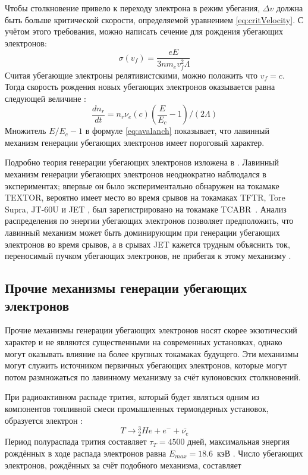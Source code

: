 Чтобы столкновение привело к переходу электрона в режим убегания, $\Delta v$ должна быть больше критической скорости, определяемой уравнением \ref{eq:critVelocity}. С учётом этого требования, можно написать сечение для рождения убегающих электронов:
\begin{equation*}
  \sigma(v_f) = \frac{ e E }{ 3 n m_e v_f^2 \Lambda }
\end{equation*}
Считая убегающие электроны релятивистскими, можно положить что $v_f = c$. Тогда скорость рождения новых убегающих электронов оказывается равна следующей величине \cite{Rozansky2012}:
\begin{equation}
  \label{eq:avalanch}
  \frac{ d n_r }{ d t } = n_r \nu_e(c) \left( \frac{E}{E_c} - 1 \right) / \left( 2 \Lambda \right)
\end{equation}
Множитель $E/E_c - 1 $ в формуле \ref{eq:avalanch} показывает, что лавинный механизм генерации убегающих электронов имеет пороговый характер.

Подробно теория генерации убегающих электронов изложена в \cite{Rosenbluth1997}. Лавинный механизм генерации убегающих электронов неоднократно наблюдался в экспериментах; впервые он было экспериментально обнаружен на токамаке TEXTOR, вероятно имеет место во время срывов на токамаках TFTR, Tore Supra, JT-60U и JET \cite{Gill2002,Helander2002}, был зарегистрировано на токамаке TCABR~\cite{Galvao2001}. Анализ распределения по энергии убегающих электронов позволяет предположить, что лавинный механизм может быть доминирующим при генерации убегающих электронов во время срывов, а в срывах JET кажется трудным объяснить ток, переносимый пучком убегающих электронов, не прибегая к этому механизму \cite{Helander2002}.



\subsection{Прочие механизмы генерации убегающих электронов}

Прочие механизмы генерации убегающих электронов носят скорее экзотический характер и не являются существенными на современных установках, однако могут оказывать влияние на более крупных токамаках будущего. Эти механизмы могут служить источником первичных убегающих электронов, которые могут потом размножаться по лавинному механизму за счёт кулоновских столкновений.

При радиоактивном распаде трития, который будет являться одним из компонентов топливной смеси промышленных термоядерных установок, образуется электрон \cite{Burrows1990}:
\begin{equation*}
  T \rightarrow {}^3_2 He + e^{-} + \bar{ \nu_e }
\end{equation*}
Период полураспада трития составляет $ \tau_T = 4500 $ дней, максимальная энергия рождённых в ходе распада электронов равна $ E_{max} = 18.6$~кэВ \cite{MartinSolis2017}. Число убегающих электронов, рождённых за счёт подобного механизма, составляет

